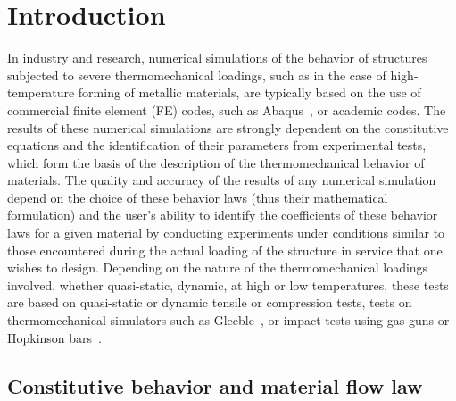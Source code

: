 \documentclass[algorithms,article,submit,pdftex,oneauthors]{Definitions/mdpi}
\begin{document}
\section{Introduction}\label{sec:Introduction}

In industry and research, numerical simulations of the behavior of structures subjected to severe thermomechanical loadings, such as in the case of high-temperature forming of metallic materials, are typically based on the use of commercial finite element (FE) codes, such as Abaqus~\cite{Abaqus}, or academic codes.
The results of these numerical simulations are strongly dependent on the constitutive equations and the identification of their parameters from experimental tests, which form the basis of the description of the thermomechanical behavior of materials.
The quality and accuracy of the results of any numerical simulation depend on the choice of these behavior laws (thus their mathematical formulation) and the user's ability to identify the coefficients of these behavior laws for a given material by conducting experiments under conditions similar to those encountered during the actual loading of the structure in service that one wishes to design.
Depending on the nature of the thermomechanical loadings involved, whether quasi-static, dynamic, at high or low temperatures, these tests are based on quasi-static or dynamic tensile or compression tests, tests on thermomechanical simulators such as Gleeble~\cite{Lin-2009-MFS, Bennett-2010-C, Kumar-2016-TMS, Yu-2019-RCR}, or impact tests using gas guns or Hopkinson bars~\cite{Kolsky-1949-IMP}.

\subsection{Constitutive behavior and material flow law}\label{subsec:ConstBehavior}
\end{document}
